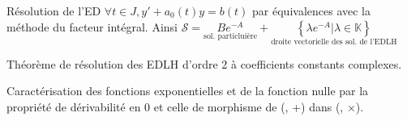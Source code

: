 \documentclass{article}
\begin{document}
\begin{question_kholle}{Résolution de l'ED  $\forall t \in J, y' + a_{0}(t)y = b(t)$ par équivalences avec la méthode du facteur intégral.}
  Ainsi $\mathcal{S} = \underset{\text{sol. particluière}}{Be^{-A}} + \underset{\text{droite vectorielle des sol. de l'EDLH}}{\left\lbrace \lambda e^{-A} | \lambda \in \mathbb{K}\right\rbrace }$
 
\end{question_kholle}

\begin{question_kholle}{Théorème de résolution des EDLH d'ordre 2 à coefficients constants complexes.}

\end{question_kholle}

\begin{question_kholle}{Caractérisation des fonctions exponentielles et de la fonction nulle par la propriété de dérivabilité en 0 et celle de morphisme de (\R, +) dans (\C, $\times$).}
  
\end{question_kholle}
\end{document}
